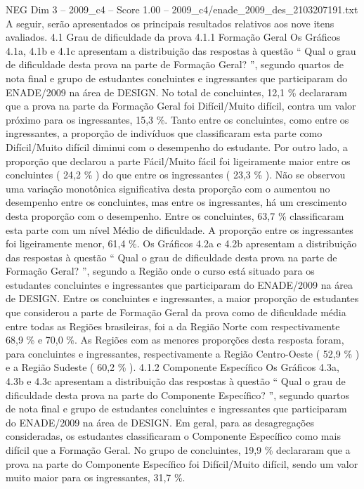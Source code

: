 \begin{textsample}{NEG Dim 3 – 2009\_c4 – Score 1.00 – 2009\_c4/enade\_2009\_des\_2103207191.txt}
A seguir, serão apresentados os principais resultados relativos aos nove itens avaliados. 4.1 Grau de dificuldade da prova 4.1.1 Formação Geral Os Gráficos 4.1a, 4.1b e 4.1c apresentam a distribuição das respostas à questão “ Qual o grau de dificuldade desta prova na parte de Formação Geral? ”, segundo quartos de nota final e grupo de estudantes concluintes e ingressantes que participaram do ENADE/2009 na área de DESIGN.
No total de concluintes, 12,1 \% declararam que a prova na parte da Formação Geral foi Difícil/Muito difícil, contra um valor próximo para os ingressantes, 15,3 \%.
Tanto entre os concluintes, como entre os ingressantes, a proporção de indivíduos que classificaram esta parte como Difícil/Muito difícil diminui com o desempenho do estudante.
Por outro lado, a proporção que declarou a parte Fácil/Muito fácil foi ligeiramente maior entre os concluintes ( 24,2 \% ) do que entre os ingressantes ( 23,3 \% ).
Não se observou uma variação monotônica significativa desta proporção com o aumentou no desempenho entre os concluintes, mas entre os ingressantes, há um crescimento desta proporção com o desempenho.
Entre os concluintes, 63,7 \% classificaram esta parte com um nível Médio de dificuldade.
A proporção entre os ingressantes foi ligeiramente menor, 61,4 \%.
Os Gráficos 4.2a e 4.2b apresentam a distribuição das respostas à questão “ Qual o grau de dificuldade desta prova na parte de Formação Geral? ”, segundo a Região onde o curso está situado para os estudantes concluintes e ingressantes que participaram do ENADE/2009 na área de DESIGN.
Entre os concluintes e ingressantes, a maior proporção de estudantes que considerou a parte de Formação Geral da prova como de dificuldade média entre todas as Regiões brasileiras, foi a da Região Norte com respectivamente 68,9 \% e 70,0 \%.
As Regiões com as menores proporções desta resposta foram, para concluintes e ingressantes, respectivamente a Região Centro-Oeste ( 52,9 \% ) e a Região Sudeste ( 60,2 \% ). 4.1.2 Componente Específico Os Gráficos 4.3a, 4.3b e 4.3c apresentam a distribuição das respostas à questão “ Qual o grau de dificuldade desta prova na parte do Componente Específico? ”, segundo quartos de nota final e grupo de estudantes concluintes e ingressantes que participaram do ENADE/2009 na área de DESIGN.
Em geral, para as desagregações consideradas, os estudantes classificaram o Componente Específico como mais difícil que a Formação Geral.
No grupo de concluintes, 19,9 \% declararam que a prova na parte do Componente Específico foi Difícil/Muito difícil, sendo um valor muito maior para os ingressantes, 31,7 \%.

\end{textsample}
